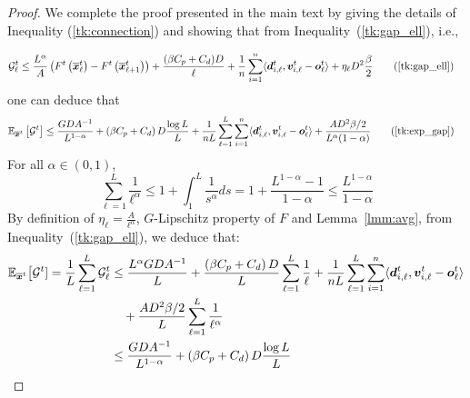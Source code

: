 \begin{proof}
We complete the proof presented in the main text by giving the details of Inequality (\ref{tk:connection}) and showing that from Inequality~(\ref{tk:gap_ell}), i.e., 

    \begin{align}
        \mathcal{G}^t_{\ell} 
        & \leq \frac{L^{\alpha}}{A} \left( F^{t} \left( \overline{\vect{x}}^t_{\ell} \right) - F^{t} \left( \overline{\vect{x}}^t_{\ell+1} \right) \right) 
        + \frac{(\beta C_p + C_d)D}{\ell} 
        + \frac{1}{n} \sum_{i=1}^{n}\langle \vect{d}^t_{i,\ell}, \vect{v}^t_{i,\ell}- \vect{o}^t_{\ell} \rangle 
        + \eta_{\ell}D^2 \frac{\beta}{2} 
		\tag{\ref{tk:gap_ell}}
    \end{align}
 one can deduce that
     \begin{align*}
        \E_{\overline{\vect{x}}^t} \left[ \mathcal{G}^t \right]
        & \leq \frac{GDA^{-1}}{L^{1-\alpha}} 
        + \left( \beta C_p + C_d \right)D\frac{\log L}{L}
        + \frac{1}{nL}\sum_{\ell=1}^{L}\sum_{i=1}^{n}\langle \vect{d}^t_{i,\ell}, \vect{v}^t_{i,\ell} - \vect{o}^t_{\ell} \rangle 
        + \frac{AD^2 \beta/2}{L^{\alpha}(1-\alpha)} \tag{\ref{tk:exp_gap}}
    \end{align*}
%
For all $\alpha \in (0, 1)$, 
%
\begin{equation*}
    \sum_{\ell=1}^{L} \frac{1}{\ell^{\alpha}} \leq 1 + \int_{1}^L \frac{1}{s^{\alpha}}ds = 1 + \frac{L^{1-\alpha} - 1}{1-\alpha} \leq \frac{L^{1-\alpha}}{1-\alpha}
\end{equation*} 
%
By definition of $\eta_{\ell} = \frac{A}{\ell^{\alpha}}$, $G$-Lipschitz property of $F$ and Lemma~\ref{lmm:avg}, from Inequality~(\ref{tk:gap_ell}), we deduce that: 
%
    \begin{align*}
        \E_{\overline{\vect{x}}^t} \bigl[\mathcal{G}^t] = \frac{1}{L}\sum_{\ell=1}^{L} \mathcal{G}^t_{\ell}
        & \leq \frac{L^{\alpha}GDA^{-1}}{L} 
        + \frac{\left(\beta C_p + C_d \right)D}{L}\sum_{\ell=1}^{L} \frac{1}{\ell} 
        + \frac{1}{nL} \sum_{\ell=1}^{L}\sum_{i=1}^{n} \langle \vect{d}^t_{i,\ell}, \vect{v}^t_{i,\ell} - \vect{o}^t_{\ell} \rangle \\
        & \quad + \frac{AD^2 \beta/2}{L} \sum_{\ell=1}^{L} \frac{1}{\ell^{\alpha}} \notag \\
        & \leq  \frac{GDA^{-1}}{L^{1-\alpha}} 
        + \left(\beta C_p + C_d \right)D \frac{\log L}{L}

\end{align*}
\end{proof}
